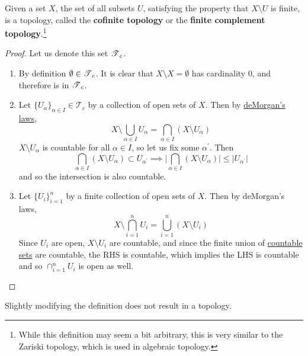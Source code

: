   \begin{definition}
    \label{def:cofinite-topology}
    Given a set $X$, the set of all subsets $U$, satisfying the property that $X \setminus U$ is finite, is a topology, called the \textbf{cofinite topology} or the \textbf{finite complement topology}.\footnote{While this definition may seem a bit arbitrary, this is very similar to the Zariski topology, which is used in algebraic topology.} 
  \end{definition}
  \begin{proof}
    Let us denote this set $\operatorname{\mathscr{T}}_c$. 
    \begin{enumerate}
      \item By definition $\emptyset \in \operatorname{\mathscr{T}}_c$. It is clear that $X \setminus X = \emptyset$ has cardinality $0$, and therefore is in $\operatorname{\mathscr{T}}_c$. 

      \item Let $\{U_\alpha\}_{\alpha \in I} \in \mathcal{T}_c$ by a collection of open sets of $X$. Then by \hyperref[st-thm:demorgan]{deMorgan's laws}, 
      \begin{equation}
        X \setminus \bigcup_{\alpha \in I} U_{\alpha} = \bigcap_{\alpha \in I} (X \setminus U_\alpha)
      \end{equation}
      $X \setminus U_\alpha$ is countable for all $\alpha \in I$, so let us fix some $\alpha^\prime$. Then 
      \begin{equation}
        \bigcap_{\alpha \in I} (X \setminus U_\alpha) \subset U_{\alpha^\prime} \implies \bigg| \bigcap_{\alpha \in I} (X \setminus U_\alpha) \bigg| \leq \big| U_{\alpha^\prime} \big| 
      \end{equation}
      and so the intersection is also countable. 

      \item Let $\{U_i\}_{i=1}^n$ by a finite collection of open sets of $X$. Then by deMorgan's laws, 
      \begin{equation}
        X \setminus \bigcap_{i=1}^n U_i = \bigcup_{i=1}^n (X \setminus U_i)
      \end{equation}
      Since $U_i$ are open, $X \setminus U_i$ are countable, and since the finite union of \hyperref[st-def:countable]{countable sets} are countable, the RHS is countable, which implies the LHS is countable and so $\cap_{i=1}^n U_i$ is open as well. 
    \end{enumerate}
  \end{proof} 

  Slightly modifying the definition does not result in a topology. 

